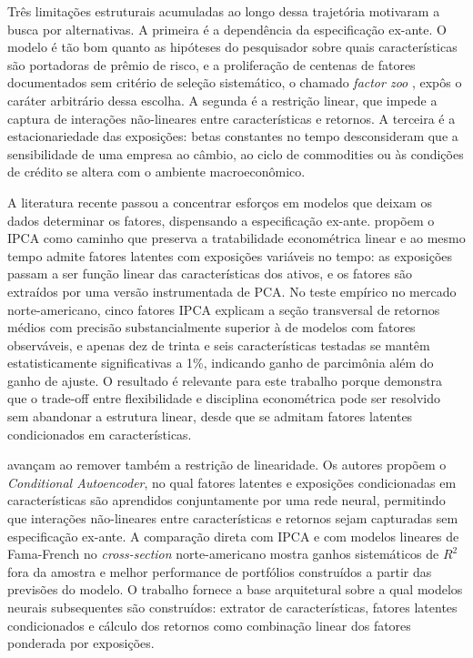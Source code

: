Três limitações estruturais acumuladas ao longo dessa trajetória motivaram a busca por
alternativas. A primeira é a dependência da especificação ex-ante. O modelo é tão bom
quanto as hipóteses do pesquisador sobre quais características são portadoras de prêmio
de risco, e a proliferação de centenas de fatores documentados sem critério de seleção
sistemático, o chamado \textit{factor zoo} \parencite{harvey2016}, expôs o caráter
arbitrário dessa escolha. A segunda é a restrição linear, que impede a captura de
interações não-lineares entre características e retornos. A terceira é a estacionariedade
das exposições: betas constantes no tempo desconsideram que a sensibilidade de uma
empresa ao câmbio, ao ciclo de commodities ou às condições de crédito se altera com o
ambiente macroeconômico.

A literatura recente passou a concentrar esforços em modelos que deixam os dados
determinar os fatores, dispensando a especificação ex-ante. \textcite{kelly2019} propõem
o IPCA como caminho que preserva a tratabilidade econométrica linear e ao mesmo tempo
admite fatores latentes com exposições variáveis no tempo: as exposições passam a ser
função linear das características dos ativos, e os fatores são extraídos por uma versão
instrumentada de PCA. No teste empírico no mercado norte-americano, cinco fatores IPCA
explicam a seção transversal de retornos médios com precisão substancialmente superior à
de modelos com fatores observáveis, e apenas dez de trinta e seis características
testadas se mantêm estatisticamente significativas a 1\%, indicando ganho de parcimônia
além do ganho de ajuste. O resultado é relevante para este trabalho porque demonstra que
o trade-off entre flexibilidade e disciplina econométrica pode ser resolvido sem
abandonar a estrutura linear, desde que se admitam fatores latentes condicionados em
características.

\textcite{gu2021} avançam ao remover também a restrição de linearidade. Os autores
propõem o \textit{Conditional Autoencoder}, no qual fatores latentes e exposições
condicionadas em características são aprendidos conjuntamente por uma rede neural,
permitindo que interações não-lineares entre características e retornos sejam capturadas
sem especificação ex-ante. A comparação direta com IPCA e com modelos lineares de
Fama-French no \textit{cross-section} norte-americano mostra ganhos sistemáticos de
$R^2$ fora da amostra e melhor performance de portfólios construídos a partir das
previsões do modelo. O trabalho fornece a base arquitetural sobre a qual modelos neurais
subsequentes são construídos: extrator de características, fatores latentes condicionados
e cálculo dos retornos como combinação linear dos fatores ponderada por exposições.

